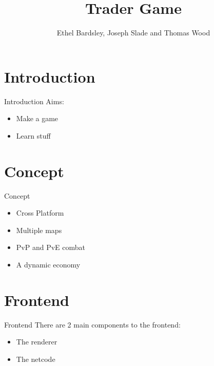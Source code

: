 
\usepackage{algorithm2e}
\usepackage{graphicx}
\usepackage[parfill]{parskip}
\usepackage{appendix}
\usepackage{amsmath}
\usepackage{multicol}

\title{Trader Game}
\author{Ethel Bardsley, Joseph Slade and Thomas Wood}



\begin{frame}
  \titlepage
\end{frame}

\section{Introduction}
\begin{frame}{Introduction}
  Aims:
    \begin{itemize}
      \item Make a game
      \item Learn stuff
    \end{itemize}
\end{frame}

\section{Concept}
\begin{frame}{Concept}
  \begin{itemize}
    \item Cross Platform
    \item Multiple maps
    \item PvP and PvE combat
    \item A dynamic economy
  \end{itemize}
\end{frame}

\section{Frontend}
\begin{frame}{Frontend}
  There are 2 main components to the frontend:
  \begin{itemize}
    \item The renderer
    \item The netcode
  \end{itemize}
\end{frame}


